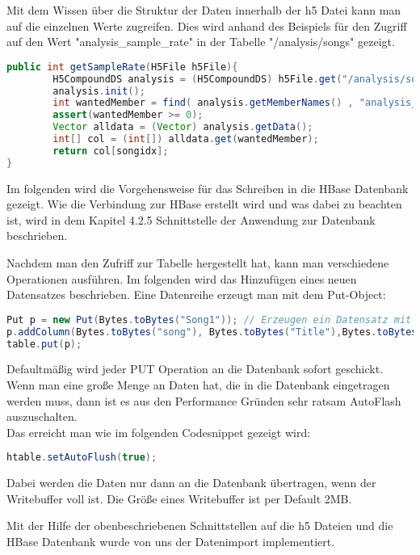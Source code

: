 Mit dem Wissen über die Struktur der Daten innerhalb der h5 Datei kann man auf die einzelnen Werte zugreifen. Dies wird anhand des Beispiels für den Zugriff auf den Wert "analysis_sample_rate" in der Tabelle "/analysis/songs" gezeigt.

\begin{lstlisting}[language=Java]
public int getSampleRate(H5File h5File){
        H5CompoundDS analysis = (H5CompoundDS) h5File.get("/analysis/songs");
        analysis.init();
        int wantedMember = find( analysis.getMemberNames() , "analysis_sample_rate");
        assert(wantedMember >= 0);
        Vector alldata = (Vector) analysis.getData();
        int[] col = (int[]) alldata.get(wantedMember);
        return col[songidx];
}
\end{lstlisting}

Im folgenden wird die Vorgehensweise für das Schreiben in die HBase Datenbank gezeigt. Wie die Verbindung zur HBase erstellt wird und was dabei zu beachten ist, wird in dem Kapitel 4.2.5 Schnittstelle der Anwendung zur Datenbank beschrieben.

Nachdem man den Zufriff zur Tabelle hergestellt hat, kann man verschiedene Operationen ausführen.
Im folgenden wird das Hinzufügen eines neuen Datensatzes beschrieben.
Eine Datenreihe erzeugt man mit dem Put-Object:

\begin{lstlisting}[language=Java]
Put p = new Put(Bytes.toBytes("Song1")); // Erzeugen ein Datensatz mit dem RowKey = "Song1''
p.addColumn(Bytes.toBytes("song"), Bytes.toBytes("Title"),Bytes.toBytes("HISTORY")); //Erzeuge für diesen RowKey in der Spaltenfamilie "song", Spalte: "Title" den Wert "HISTORY"
table.put(p);
\end{lstlisting}

Defaultmäßig wird jeder PUT Operation an die Datenbank sofort geschickt. Wenn man eine große Menge an Daten hat, die in die Datenbank eingetragen werden muss, dann ist es aus den Performance Gründen sehr ratsam AutoFlash auszuschalten. \\
Das erreicht man wie im folgenden Codesnippet gezeigt wird:
\begin{lstlisting}[language=Java]
htable.setAutoFlush(true);
\end{lstlisting}
Dabei werden die Daten nur dann an die Datenbank übertragen, wenn der Writebuffer voll ist. Die Größe eines Writebuffer ist per Default 2MB. 

Mit der Hilfe der obenbeschriebenen Schnittstellen auf die h5 Dateien und die HBase Datenbank wurde von uns der Datenimport implementiert.

